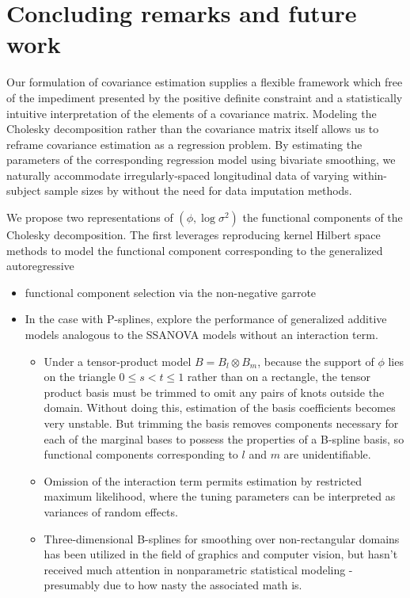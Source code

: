 
\chapter{Concluding remarks and future work}\label{concluding-remarks-chapter}




Our formulation of covariance estimation supplies a flexible framework which free of the impediment presented by the positive definite constraint and a statistically intuitive interpretation of the elements of a covariance matrix. Modeling the Cholesky decomposition rather than the covariance matrix itself allows us to reframe covariance estimation as a regression problem. By estimating the parameters of the corresponding regression model using bivariate smoothing, we naturally accommodate irregularly-spaced longitudinal data of varying within-subject sample sizes by without the need for data imputation methods. 

\bigskip

We propose two representations of $\left(\phi, \log\sigma^2\right)$ the functional components of the Cholesky decomposition. The first leverages reproducing kernel Hilbert space methods to model the functional component corresponding to the generalized autoregressive


\begin{itemize}
\item functional component selection via the non-negative garrote
\item In the case with P-splines, explore the performance of generalized additive models analogous to the SSANOVA models without an interaction term.
	\begin{itemize}
	\item Under a tensor-product model $B = B_l \otimes B_m$, because the support of $\phi$ lies on the triangle $0 \le s < t \le 1$ rather than on a rectangle, the tensor product basis must be trimmed to omit any pairs of knots outside the domain. Without doing this, estimation of the basis coefficients becomes very unstable. But trimming the basis removes components necessary for each of the marginal bases to possess the properties of a B-spline basis, so functional components corresponding to $l$ and $m$ are unidentifiable. 
	\item Omission of the interaction term permits estimation by restricted maximum likelihood, where the tuning parameters can be interpreted as variances of random effects.
	\item Three-dimensional B-splines for smoothing over non-rectangular domains has been utilized in the field of graphics and computer vision, but hasn't received much attention in nonparametric statistical modeling - presumably due to how nasty the associated math is. 
	\end{itemize}
\end{itemize}

